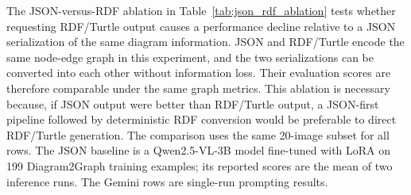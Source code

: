 \documentclass[preprint,12pt]{elsarticle}
\begin{document}
The JSON-versus-RDF ablation in Table~\ref{tab:json_rdf_ablation} tests whether requesting RDF/Turtle output causes a performance decline relative to a JSON serialization of the same diagram information. JSON and RDF/Turtle encode the same node-edge graph in this experiment, and the two serializations can be converted into each other without information loss. Their evaluation scores are therefore comparable under the same graph metrics. This ablation is necessary because, if JSON output were better than RDF/Turtle output, a JSON-first pipeline followed by deterministic RDF conversion would be preferable to direct RDF/Turtle generation. The comparison uses the same 20-image subset for all rows. The JSON baseline is a Qwen2.5-VL-3B model \citep{bai2025qwen25vl} fine-tuned with LoRA \citep{hu2022lora} on 199 Diagram2Graph training examples; its reported scores are the mean of two inference runs. The Gemini rows are single-run prompting results.

\begin{table}[ht]
\centering
\small
{}
\caption{Diagram2Graph JSON-versus-RDF serialization ablation on the same 20-image subset. Abbreviations follow Table~\ref{tab:vistext_strategy_results}. The Qwen baseline reports the mean over two inference runs.}
\label{tab:json_rdf_ablation}
\end{table}
\end{document}

